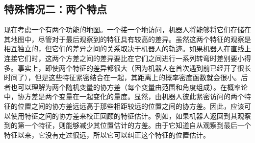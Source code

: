 \subsection{特殊情况二：两个特点}
现在考虑一个有两个功能的地图。一个接一个地访问，机器人将能够将它们存储在其地图中，尽管对于最后观察到的特征具有较高的差异。虽然这两个特征的观察是相互独立的，但它们的差异之间的关系取决于机器人的轨迹。如果机器人在直线上连接它们时，这两个方差之间的差异要比在它们之间进行一系列转弯时差别要小得多。事实上，即使两个特征的差异都很大（因为机器人在首次遇到前已经开了很长时间了），但是这些特征紧密结合在一起，其距离上的概率密度函数就会很小。后者也可以理解为两个随机变量的协方差（每个变量由范围和角度组成）。在概率论中，协方差是两个变量在一起变化的量度。显然，由机器人彼此紧密访问的两个特征的位置之间的协方差远远高于那些相距较远的位置之间的协方差。因此，应该可以使用特征之间的协方差来校正回顾的特征估计。例如，如果机器人返回到其观察到的第一个特征，则能够减少其位置估计的方差。由于它知道自从观察到最后一个特征以来，它没有走过很远，所以它可以纠正这个特征的位置估计。




